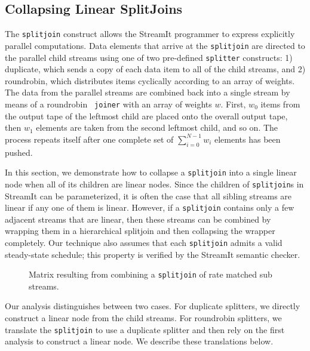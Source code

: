 \subsection{Collapsing Linear SplitJoins}

The {\tt splitjoin} construct allows the StreamIt programmer to
express explicitly parallel computations.  Data elements that arrive
at the {\tt splitjoin} are directed to the parallel child streams
using one of two pre-defined {\tt splitter} constructs: 1) duplicate,
which sends a copy of each data item to all of the child streams, and
2) roundrobin, which distributes items cyclically according to an
array of weights.  The data from the parallel streams are
combined back into a single stream by means of a roundrobin {\tt
joiner} with an array of weights $w$.  First, $w_0$ items from the
output tape of the leftmost child are placed onto the overall output
tape, then $w_1$ elements are taken from the second leftmost child,
and so on.  The process repeats itself after one complete set of
$\sum_{i=0}^{N-1} w_i$ elements has been pushed.

In this section, we demonstrate how to collapse a {\tt splitjoin} into
a single linear node when all of its children are linear nodes.  Since
the children of {\tt splitjoin}s in StreamIt can be parameterized, it
is often the case that all sibling streams are linear if any one of
them is linear.  However, if a {\tt splitjoin} contains only a few
adjacent streams that are linear, then these streams can be combined
by wrapping them in a hierarchical splitjoin and then collapsing the
wrapper completely.  Our technique also assumes that each 
{\tt splitjoin} admits a valid steady-state schedule; this property is
verified by the StreamIt semantic checker.

\begin{figure}[t]
\center
\epsfxsize=3.0in
\caption{Matrix resulting from combining a {\tt splitjoin} of rate matched sub streams.
\protect\label{fig:splitjoin-duplicate-matrix}}
\vspace{-12pt}
\end{figure}

Our analysis distinguishes between two cases.  For duplicate
splitters, we directly construct a linear node from the child streams.
For roundrobin splitters, we translate the {\tt splitjoin} to use a
duplicate splitter and then rely on the first analysis to construct a
linear node.  We describe these translations below.

